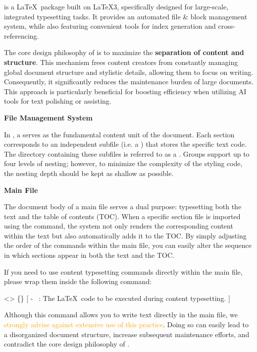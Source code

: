 
\SimpleSystemTeX is a \LaTeX\ package built on \LaTeX3, specifically designed for large-scale, integrated typesetting tasks. It provides an automated file \& block management system, while also featuring convenient tools for index generation and cross-referencing.

The core design philosophy of \SimpleSystemTeX is to maximize the \textbf{separation of content and structure}. This mechanism frees content creators from constantly managing global document structure and stylistic details, allowing them to focus on writing. Consequently, it significantly reduces the maintenance burden of large documents. This approach is particularly beneficial for boosting efficiency when utilizing AI tools for text polishing or assisting.

\medskip\textbf{File Management System}

In \SimpleSystemTeX, a  serves as the fundamental content unit of the document. Each section corresponds to an independent subfile (i.e. a ) that stores the specific text code. The directory containing these subfiles is referred to as a . Groups support up to four levels of nesting; however, to minimize the complexity of the styling code, the nesting depth should be kept as shallow as possible.

\medskip\textbf{Main File}

The document body of a \SimpleSystemTeX main file serves a dual purpose: typesetting both the text and the table of contents (TOC). When a specific section file is imported using the  command, the system not only renders the corresponding content within the text but also automatically adds it to the TOC. By simply adjusting the order of the  commands within the main file, you can easily alter the sequence in which sections appear in both the text and the TOC.

If you need to use content typesetting commands directly within the main file, please wrap them inside the following command:

<>{
    \{\longarg\}
}[
    - \longarg\ : The \LaTeX\ code to be executed during content typesetting.
]

Although this command allows you to write text directly in the main file, we \textcolor{orange}{strongly advise against extensive use of this practice}. Doing so can easily lead to a disorganized document structure, increase subsequent maintenance efforts, and contradict the core design philosophy of \SimpleSystemTeX.

